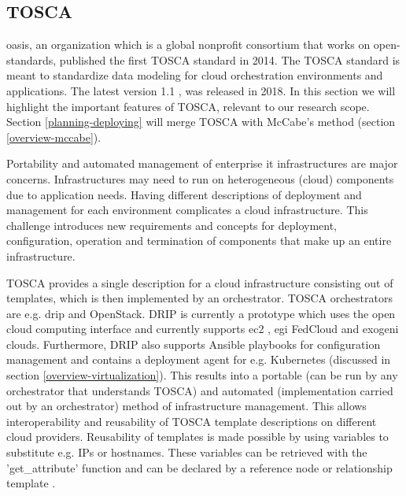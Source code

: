 \subsection{TOSCA}
\label{overview-tosca}
\gls{oasis}, an organization which is a global nonprofit consortium that works on open-standards, published the first TOSCA standard in 2014. The TOSCA standard is meant to standardize data modeling for cloud orchestration environments and applications. The latest version 1.1 \cite{tosca-standard}, was released in 2018. In this section we will highlight the important features of TOSCA, relevant to our research scope. Section \ref{planning-deploying} will merge TOSCA with McCabe's method (section \ref{overview-mccabe}).

Portability and automated management of enterprise \gls{it} infrastructures are major concerns. Infrastructures may need to run on heterogeneous (cloud) components due to application needs. Having different descriptions of deployment and management for each environment complicates a cloud infrastructure. This challenge introduces new requirements and concepts for deployment, configuration, operation and termination of components that make up an entire infrastructure.

TOSCA provides a single description for a cloud infrastructure consisting out of templates, which is then implemented by an orchestrator. TOSCA orchestrators are e.g. \gls{drip} and OpenStack. DRIP is currently a prototype which uses the open cloud computing interface and currently supports \gls{ec2} \cite{amazon-website}, \gls{egi} FedCloud \cite{egi-website} and \gls{exogeni} \cite{exogeni-website} clouds. Furthermore, DRIP also supports Ansible playbooks \cite{ansible-website} for configuration management and contains a deployment agent for e.g. Kubernetes (discussed in section \ref{overview-virtualization}). This results into a portable (can be run by any orchestrator that understands TOSCA) and automated (implementation carried out by an orchestrator) method of infrastructure management. This allows interoperability and reusability of TOSCA template descriptions on different cloud providers. Reusability of templates is made possible by using variables to substitute e.g. IPs or hostnames. These variables can be retrieved with the 'get\_attribute' function and can be declared by a reference node or relationship template \cite{tosca-attributes}.

